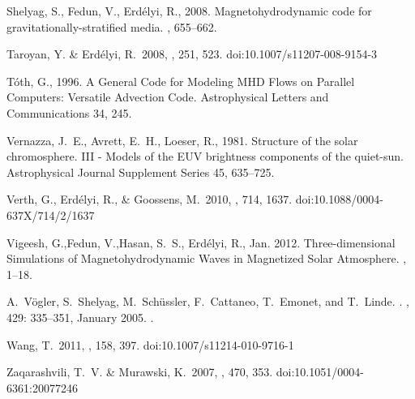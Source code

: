 \documentclass[linenumbers]{aastex63}
\begin{document}
\begin{thebibliography}{}
{Shelyag}, S., {Fedun}, V., {Erd{\'e}lyi}, R., 2008. {Magnetohydrodynamic code
  for gravitationally-stratified media}. , 655--662.

 Taroyan, Y. \& Erd{\'e}lyi, R.\ 2008, \solphys, 251, 523. doi:10.1007/s11207-008-9154-3



{T{\'o}th}, G., 1996. {A General Code for Modeling {MHD} Flows on Parallel
  Computers: Versatile Advection Code}. Astrophysical Letters and
  Communications 34, 245.

{Vernazza}, J.~E., {Avrett}, E.~H., {Loeser}, R., 1981. {Structure of the solar
  chromosphere. III - Models of the EUV brightness components of the
  quiet-sun}. Astrophysical Journal Supplement Series 45, 635--725.
  
 Verth, G., Erd{\'e}lyi, R., \& Goossens, M.\ 2010, \apj, 714, 1637. doi:10.1088/0004-637X/714/2/1637

{Vigeesh}, G.,{Fedun}, V.,{Hasan}, S.~S., {Erd{\'e}lyi}, R.,  Jan. 2012. {Three-dimensional Simulations of Magnetohydrodynamic Waves in Magnetized Solar Atmosphere}. , 1--18.



A.~{V{\"o}gler}, S.~{Shelyag}, M.~{Sch{\"u}ssler}, F.~{Cattaneo}, T.~{Emonet},
  and T.~{Linde}.
.
\newblock \emph{\aap}, 429: 335--351, January 2005.
\newblock {}.

 Wang, T.\ 2011, \ssr, 158, 397. doi:10.1007/s11214-010-9716-1

 Zaqarashvili, T.~V. \& Murawski, K.\ 2007, \aap, 470, 353. doi:10.1051/0004-6361:20077246



\end{thebibliography}
\end{document}
